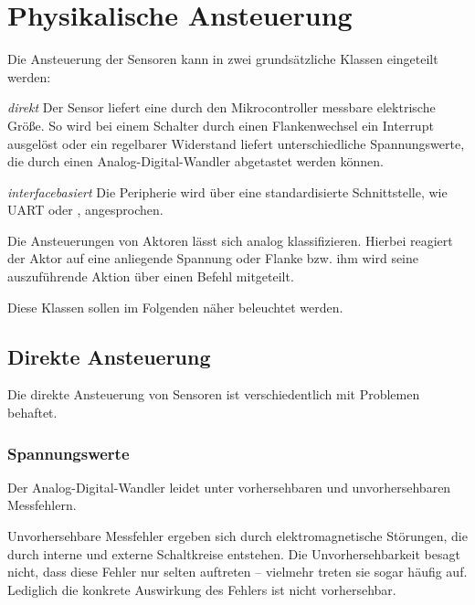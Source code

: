 \section{Physikalische Ansteuerung}


	Die Ansteuerung der Sensoren kann in zwei grundsätzliche Klassen
	eingeteilt werden:
	\begin{LaTeXdescription}
	\item[\normalfont\itshape direkt]
		Der Sensor liefert eine durch den Mikrocontroller messbare
		elektrische Größe.  So wird bei einem Schalter durch einen
		Flankenwechsel ein Interrupt ausgelöst oder ein regelbarer
		Widerstand liefert unterschiedliche Spannungswerte, die
		durch einen Analog-Digital-Wandler abgetastet werden können.
	\item[\normalfont\itshape interfacebasiert]
		Die Peripherie wird über eine standardisierte Schnittstelle,
		wie UART oder \ItC, angesprochen.
	\end{LaTeXdescription}
	Die Ansteuerungen von Aktoren lässt sich analog klassifizieren.  Hierbei
	reagiert der Aktor auf eine anliegende Spannung oder Flanke bzw. ihm
	wird seine auszuführende Aktion über einen Befehl mitgeteilt.

	Diese Klassen sollen im Folgenden näher beleuchtet werden.


\subsection{Direkte Ansteuerung}
\label{sec:anst:direkt}
	Die direkte Ansteuerung von Sensoren ist verschiedentlich mit Problemen
	behaftet.
\subsubsection{Spannungswerte}
	Der Analog-Digital-Wandler leidet unter vorhersehbaren und unvorhersehbaren
	Messfehlern.

	Unvorhersehbare Messfehler ergeben sich durch elektromagnetische
	Störungen, die durch interne und externe Schaltkreise entstehen.
	\autocite[][S.\,422]{atmega128rfa1} Die Unvorhersehbarkeit besagt nicht,
	dass diese Fehler nur selten auftreten -- vielmehr treten sie sogar
	häufig auf.  Lediglich die konkrete Auswirkung des Fehlers ist
	nicht vorhersehbar.

